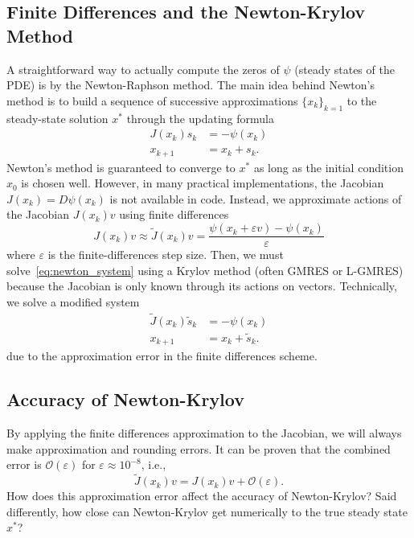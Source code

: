 \documentclass{article}
\begin{document}
\subsection{Finite Differences and the Newton-Krylov Method}
A straightforward way to actually compute the zeros of $\psi$ (steady states of the PDE) is by the Newton-Raphson method. The main idea behind Newton's method is to build a sequence of successive approximations $\{x_k\}_{k=1}$ to the steady-state solution $x^*$ through the updating formula
\begin{align} \label{eq:newton_system}
    J(x_k) s_k &= -\psi(x_k) \\
    x_{k+1} &= x_k + s_k.
\end{align}
Newton's method is guaranteed to converge to $x^*$ as long as the initial condition $x_0$ is chosen well. However, in many practical implementations, the Jacobian $J(x_k) = D\psi(x_k)$ is not available in code. Instead, we approximate actions of the Jacobian $J(x_k) v$ using finite differences
\begin{equation} \label{eq:fd}
    J(x_k) v \approx \tilde{J}(x_k) v = \frac{\psi(x_k + \varepsilon v) - \psi(x_k)}{\varepsilon}
\end{equation}
where $\varepsilon$ is the finite-differences step size. Then, we must solve~\eqref{eq:newton_system} using a Krylov method (often GMRES or L-GMRES) because the Jacobian is only known through its actions on vectors. Technically, we solve a modified system
\begin{align} \label{eq:newton_system_mpd}
    \tilde{J}(x_k) \tilde{s}_k &= -\psi(x_k) \\
    x_{k+1} &= x_k + \tilde{s}_k.
\end{align}
due to the approximation error in the finite differences scheme.

\subsection{Accuracy of Newton-Krylov}
By applying the finite differences approximation to the Jacobian, we will always make approximation and rounding errors. It can be proven that the combined error is $\mathcal{O}(\varepsilon)$ for $\varepsilon \approx 10^{-8}$, i.e.,
\begin{equation}
    \tilde{J}(x_k) v = J(x_k) v + \mathcal{O}(\varepsilon).
\end{equation}
How does this approximation error affect the accuracy of Newton-Krylov? Said differently, how close can Newton-Krylov get numerically to the true steady state $x^*$? 
\end{document}
